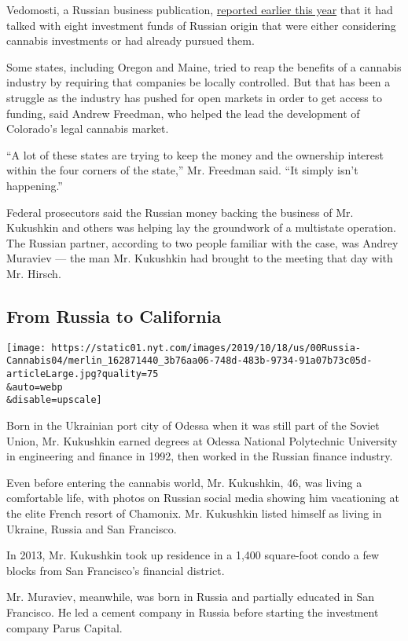 Vedomosti, a Russian business publication,
\href{https://www.vedomosti.ru/business/articles/2019/05/22/802199-na-rinok}{reported
earlier this year} that it had talked with eight investment funds of
Russian origin that were either considering cannabis investments or had
already pursued them.

Some states, including Oregon and Maine, tried to reap the benefits of a
cannabis industry by requiring that companies be locally controlled. But
that has been a struggle as the industry has pushed for open markets in
order to get access to funding, said Andrew Freedman, who helped the
lead the development of Colorado's legal cannabis market.

``A lot of these states are trying to keep the money and the ownership
interest within the four corners of the state,'' Mr. Freedman said. ``It
simply isn't happening.''

Federal prosecutors said the Russian money backing the business of Mr.
Kukushkin and others was helping lay the groundwork of a multistate
operation. The Russian partner, according to two people familiar with
the case, was Andrey Muraviev --- the man Mr. Kukushkin had brought to
the meeting that day with Mr. Hirsch.

\hypertarget{from-russia-to-california}{%
\subsection{From Russia to California}\label{from-russia-to-california}}

\texttt{[image: https://static01.nyt.com/images/2019/10/18/us/00Russia-Cannabis04/merlin\_162871440\_3b76aa06-748d-483b-9734-91a07b73c05d-articleLarge.jpg?quality=75\\\&auto=webp\\\&disable=upscale]}

Born in the Ukrainian port city of Odessa when it was still part of the
Soviet Union, Mr. Kukushkin earned degrees at Odessa National
Polytechnic University in engineering and finance in 1992, then worked
in the Russian finance industry.

Even before entering the cannabis world, Mr. Kukushkin, 46, was living a
comfortable life, with photos on Russian social media showing him
vacationing at the elite French resort of Chamonix. Mr. Kukushkin listed
himself as living in Ukraine, Russia and San Francisco.

In 2013, Mr. Kukushkin took up residence in a 1,400 square-foot condo a
few blocks from San Francisco's financial district.

Mr. Muraviev, meanwhile, was born in Russia and partially educated in
San Francisco. He led a cement company in Russia before starting the
investment company Parus Capital.

